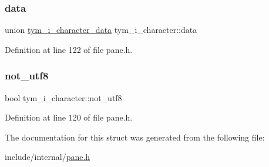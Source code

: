 \subsubsection{\texorpdfstring{data}{data}}
{\footnotesize\ttfamily union \hyperlink{uniontym__i__character__data}{tym\+\_\+i\+\_\+character\+\_\+data} tym\+\_\+i\+\_\+character\+::data}



Definition at line 122 of file pane.\+h.

\mbox{\label{structtym__i__character_a4dd1b66f6a453c6b7243d51549b27160}} 
\subsubsection{\texorpdfstring{not\+\_\+utf8}{not\_utf8}}
{\footnotesize\ttfamily bool tym\+\_\+i\+\_\+character\+::not\+\_\+utf8}



Definition at line 120 of file pane.\+h.



The documentation for this struct was generated from the following file\+:\begin{DoxyCompactItemize}
\item 
include/internal/\hyperlink{pane_8h}{pane.\+h}\end{DoxyCompactItemize}
